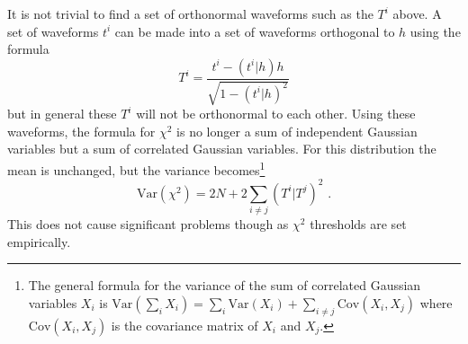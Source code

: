 \documentclass[11pt]{cuthesis}
\newcommand{\fs}{\text{ .}}
\begin{document}
It is not trivial to find a set of orthonormal waveforms such as the $T^i$ above. A set of waveforms $t^i$ can be made into a set of waveforms orthogonal to $h$ using the formula
\begin{equation}
T^i = \frac{t^i - (t^i|h)h}{\sqrt{1-(t^i|h)^2}}
\end{equation}
but in general these $T^i$ will not be orthonormal to each other. Using these waveforms, the formula for $\chi^2$ is no longer a sum of independent Gaussian variables but a sum of correlated Gaussian variables. For this distribution the mean is unchanged, but the variance becomes\footnote{The general formula for the variance of the sum of correlated Gaussian variables $X_i$ is $\text{Var}(\sum_i X_i) = \sum_i \text{Var}(X_i) + \sum_{i \neq j} \text{Cov}(X_i,X_j) $ where $\text{Cov}(X_i,X_j)$ is the covariance matrix of $X_i$ and $X_j$.}
\begin{equation} \label{single det chisq var}
\text{Var}(\chi^2) = 2N + 2\sum_{i \neq j} (T^i|T^j)^2 \fs
\end{equation}
This does not cause significant problems though as $\chi^2$ thresholds are set empirically. 
\end{document}
